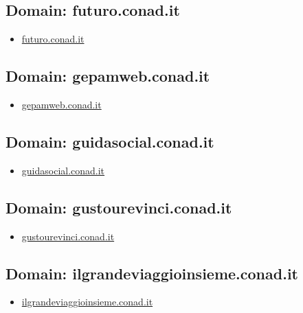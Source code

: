 \documentclass{article}
\begin{document}
    \subsection{Domain: futuro.conad.it}
    \begin{itemize}
        
            
            \item \href{ https://futuro.conad.it/}{ futuro.conad.it }
            
        
    \end{itemize}

    \subsection{Domain: gepamweb.conad.it}
    \begin{itemize}
        
            
            \item \href{ http://gepamweb.conad.it}{ gepamweb.conad.it }
            
        
    \end{itemize}

    \subsection{Domain: guidasocial.conad.it}
    \begin{itemize}
        
            
            \item \href{ https://guidasocial.conad.it/}{ guidasocial.conad.it }
            
        
    \end{itemize}

    \subsection{Domain: gustourevinci.conad.it}
    \begin{itemize}
        
            
            \item \href{ http://gustourevinci.conad.it/vincitori2020/gustourevinci.htm}{ gustourevinci.conad.it }
            
        
    \end{itemize}

    \subsection{Domain: ilgrandeviaggioinsieme.conad.it}
    \begin{itemize}
        
            
            \item \href{ https://ilgrandeviaggioinsieme.conad.it/}{ ilgrandeviaggioinsieme.conad.it }
            
        
    \end{itemize}
\end{document}
